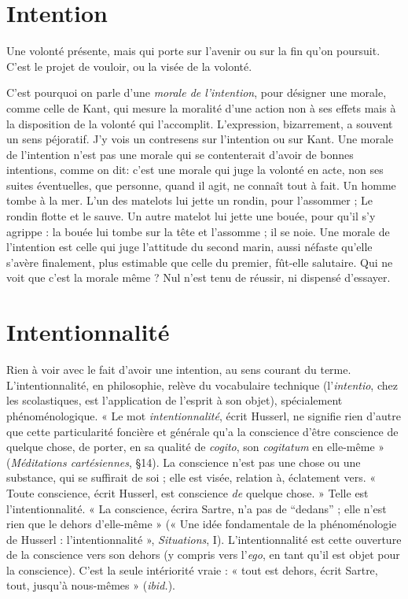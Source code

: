 \section{Intention}
Une volonté présente, mais qui porte sur l’avenir ou sur la fin
qu’on poursuit. C’est le projet de vouloir, ou la visée de la
volonté.

C’est pourquoi on parle d’une {\it morale de l'intention}, pour désigner une
morale, comme celle de Kant, qui mesure la moralité d’une action non à ses
effets mais à la disposition de la volonté qui l’accomplit. L'expression, bizarrement,
a souvent un sens péjoratif. J'y vois un contresens sur l’intention ou sur
Kant. Une morale de l'intention n’est pas une morale qui se contenterait
d’avoir de bonnes intentions, comme on dit: c’est une morale qui juge la
volonté en acte, non ses suites éventuelles, que personne, quand il agit, ne
connaît tout à fait. Un homme tombe à la mer. L'un des matelots lui jette un
rondin, pour l’assommer ; Le rondin flotte et le sauve. Un autre matelot lui jette
une bouée, pour qu’il s’y agrippe : la bouée lui tombe sur la tête et l’assomme ;
il se noie. Une morale de l'intention est celle qui juge l'attitude du second
marin, aussi néfaste qu’elle s’avère finalement, plus estimable que celle du
premier, fût-elle salutaire. Qui ne voit que c’est la morale même ? Nul n’est
tenu de réussir, ni dispensé d’essayer.

\section{Intentionnalité}
Rien à voir avec le fait d’avoir une intention, au sens
courant du terme. L’intentionnalité, en philosophie,
relève du vocabulaire technique (l’{\it intentio}, chez les scolastiques, est l’application
de l'esprit à son objet), spécialement phénoménologique. « Le mot {\it intentionnalité},
écrit Husserl, ne signifie rien d’autre que cette particularité foncière
et générale qu’a la conscience d’être conscience de quelque chose, de porter, en
sa qualité de {\it cogito}, son {\it cogitatum} en elle-même » ({\it Méditations cartésiennes},
\S 14). La conscience n’est pas une chose ou une substance, qui se suffirait de
soi ; elle est visée, relation à, éclatement vers. « Toute conscience, écrit Husserl,
est conscience {\it de} quelque chose. » Telle est l’intentionnalité. « La conscience,
écrira Sartre, n’a pas de “dedans” ; elle n’est rien que le dehors d’elle-même »
(« Une idée fondamentale de la phénoménologie de Husserl : l’intentionnalité »,
{\it Situations}, I). L’intentionnalité est cette ouverture de la conscience vers
son dehors (y compris vers l’{\it ego}, en tant qu’il est objet pour la conscience).
C’est la seule intériorité vraie : « tout est dehors, écrit Sartre, tout, jusqu’à
nous-mêmes » ({\it ibid.}).

